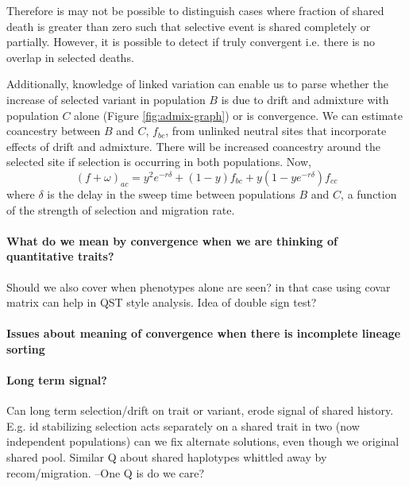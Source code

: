 \documentclass[a4paper,10pt]{article}
\begin{document}
Therefore is may not be possible to distinguish cases where fraction of shared death is greater than zero such that selective event is shared completely or partially. However, it is possible to detect if truly convergent i.e. there is no overlap in selected deaths.

Additionally, knowledge of linked variation can enable us to parse whether the increase of selected variant in population $B$ is due to drift and admixture with population $C$ alone (Figure \ref{fig:admix-graph}) or is convergence. We can estimate coancestry between $B$ and $C$, $f_{bc}$, from unlinked neutral sites that incorporate effects of drift and admixture. There will be increased coancestry around the selected site if selection is occurring in both populations. Now, 
\begin{equation} \label{eq: sharedS}
(f+\omega)_{ac} = y^2e^{-r\delta} + (1-y)f_{bc} + y(1-ye^{-r\delta})f_{cc}
\end{equation}
where $\delta$ is the delay in the sweep time between populations $B$ and $C$, a function of the strength of selection and migration rate.

\paragraph{What do we mean by convergence when we are thinking of quantitative traits?}
Should we also cover when phenotypes alone are seen? in that case using covar matrix can help in QST style analysis.
Idea of double sign test?



\paragraph{Issues about meaning of convergence when there is incomplete lineage sorting} 


\paragraph{Long term signal?}
Can long term selection/drift on trait or variant, erode signal of shared
history. E.g. id stabilizing selection acts separately on a shared
trait in two (now independent populations) can we fix alternate
solutions, even though we original shared pool. Similar Q about shared
haplotypes whittled away by recom/migration. 
--One Q is do we care? 
\end{document}

